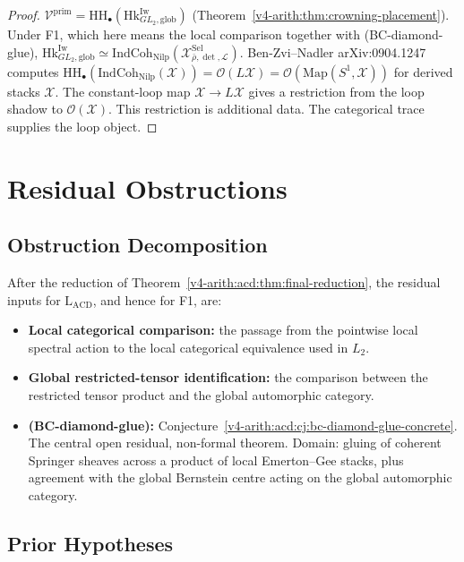 \begin{proof}
\(\mathcal{V}^{\mathrm{prim}}=\mathrm{HH}_{\bullet}(\mathrm{Hk}^{\mathrm{Iw}}_{GL_{2},\mathrm{glob}})\)
(Theorem~\ref{v4-arith:thm:crowning-placement}). Under F1, which here means
the local comparison together with (BC-diamond-glue),
\(\mathrm{Hk}^{\mathrm{Iw}}_{GL_{2},\mathrm{glob}}\simeq\mathrm{IndCoh}_{\mathrm{Nilp}}(\mathcal{X}^{\mathrm{Sel}}_{\bar\rho,\det,\mathcal{L}})\).
Ben-Zvi--Nadler arXiv:0904.1247 computes
\(\mathrm{HH}_{\bullet}(\mathrm{IndCoh}_{\mathrm{Nilp}}(\mathcal{X}))=\mathcal{O}(L\mathcal{X})=\mathcal{O}(\mathrm{Map}(S^{1},\mathcal{X}))\)
for derived stacks \(\mathcal{X}\). The constant-loop map
\(\mathcal{X}\to L\mathcal{X}\) gives a restriction from the loop
shadow to \(\mathcal{O}(\mathcal{X})\).  This restriction is additional
data.  The categorical trace supplies the loop object.
\end{proof}

\section{Residual Obstructions}
\label{v4-arith:acd:residuals}

\subsection{Obstruction Decomposition}

After the reduction of Theorem~\ref{v4-arith:acd:thm:final-reduction}, the
residual inputs for \(\mathrm{L}_{\mathrm{ACD}}\), and hence for F1,
are:

\begin{itemize}
\item \textbf{Local categorical comparison:} the passage from the
pointwise local spectral action to the local categorical equivalence
used in \(L_{2}\).
\item \textbf{Global restricted-tensor identification:} the comparison
between the restricted tensor product and the global automorphic
category.
\item \textbf{(BC-diamond-glue):}
Conjecture~\ref{v4-arith:acd:cj:bc-diamond-glue-concrete}. The central open
residual, non-formal theorem. Domain: gluing of coherent Springer
sheaves across a product of local Emerton--Gee stacks, plus
agreement with the global Bernstein centre acting on the global
automorphic category.
\end{itemize}

\subsection{Prior Hypotheses}

